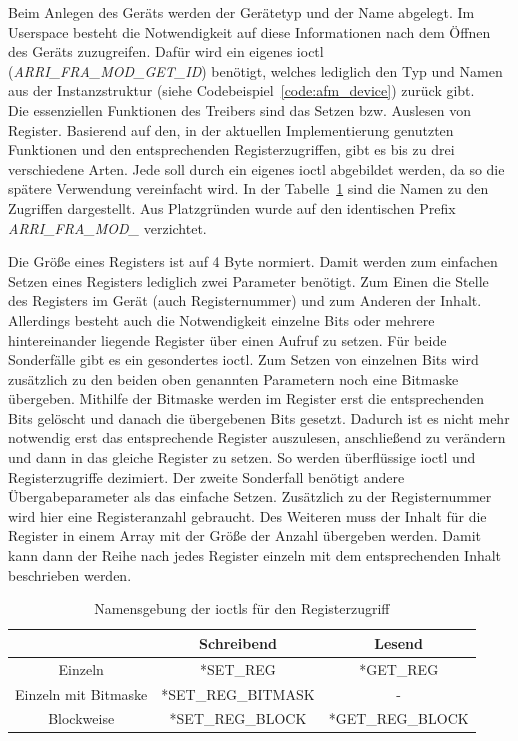 Beim Anlegen des Geräts werden der Gerätetyp und der Name abgelegt. Im Userspace besteht die Notwendigkeit auf diese Informationen nach dem Öffnen des Geräts zuzugreifen. Dafür wird ein eigenes \ac{ioctl} (\textit{ARRI\_FRA\_MOD\_GET\_ID}) benötigt, welches lediglich den Typ und Namen aus der Instanzstruktur (siehe Codebeispiel~\ref{code:afm_device}) zurück gibt.\\

Die essenziellen Funktionen des Treibers sind das Setzen bzw. Auslesen von Register. Basierend auf den, in der aktuellen Implementierung genutzten Funktionen und den entsprechenden Registerzugriffen, gibt es bis zu drei verschiedene Arten. Jede soll durch ein eigenes \ac{ioctl} abgebildet werden, da so die spätere Verwendung vereinfacht wird.  In der Tabelle~\ref{tab:ioctl} sind die Namen zu den Zugriffen dargestellt. Aus Platzgründen wurde auf den identischen Prefix \textit{ARRI\_FRA\_MOD\_} verzichtet.



Die Größe eines Registers ist auf 4 Byte normiert. Damit werden zum einfachen Setzen eines Registers lediglich zwei Parameter benötigt. Zum Einen die Stelle des Registers im Gerät (auch Registernummer) und zum Anderen der Inhalt. 
Allerdings besteht auch die Notwendigkeit einzelne Bits oder mehrere hintereinander liegende Register über einen Aufruf zu setzen. Für beide Sonderfälle gibt es ein gesondertes \ac{ioctl}. Zum Setzen von einzelnen Bits wird zusätzlich zu den beiden oben genannten Parametern noch eine Bitmaske übergeben. Mithilfe der Bitmaske werden im Register erst die entsprechenden Bits gelöscht und danach die übergebenen Bits gesetzt. Dadurch ist es nicht mehr notwendig erst das entsprechende Register auszulesen, anschließend zu verändern und dann in das gleiche Register zu setzen. So werden überflüssige \ac{ioctl} und Registerzugriffe dezimiert.
Der zweite Sonderfall benötigt andere Übergabeparameter als das einfache Setzen. Zusätzlich zu der Registernummer wird hier eine Registeranzahl gebraucht. Des Weiteren muss der Inhalt für die Register in einem Array mit der Größe der Anzahl übergeben werden. Damit kann dann der Reihe nach jedes Register einzeln mit dem entsprechenden Inhalt beschrieben werden.\\

\begin{table}
\centering	
\begin{tabular}[h]{c|c|c}
	& Schreibend & Lesend \\
	\hline
	Einzeln & *SET\_REG & *GET\_REG\\
	\hline
	Einzeln mit Bitmaske & *SET\_REG\_BITMASK & - \\
	\hline
	Blockweise & *SET\_REG\_BLOCK & *GET\_REG\_BLOCK\\
\end{tabular}
\caption{Namensgebung der \ac{ioctl}s für den Registerzugriff} \label{tab:ioctl}
\end{table}


